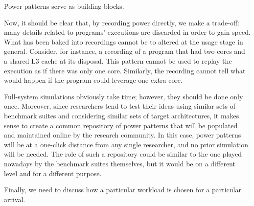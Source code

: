 Power patterns serve as building blocks.

Now, it should be clear that, by recording power directly, we make a trade-off:
many details related to programs' executions are discarded in order to gain
speed. What has been baked into recordings cannot be to altered at the usage
stage in general. Consider, for instance, a recording of a program that had two
cores and a shared L3 cache at its disposal. This pattern cannot be used to
replay the execution as if there was only one core. Similarly, the recording
cannot tell what would happen if the program could leverage one extra core.

Full-system simulations obviously take time; however, they should be done only
once. Moreover, since researchers tend to test their ideas using similar sets of
benchmark suites and considering similar sets of target architectures, it makes
sense to create a common repository of power patterns that will be populated and
maintained online by the research community. In this case, power patterns will
be at a one-click distance from any single researcher, and no prior simulation
will be needed. The role of such a repository could be similar to the one played
nowadays by the benchmark suites themselves, but it would be on a different
level and for a different purpose.

Finally, we need to discuss how a particular workload is chosen for a particular
arrival.
